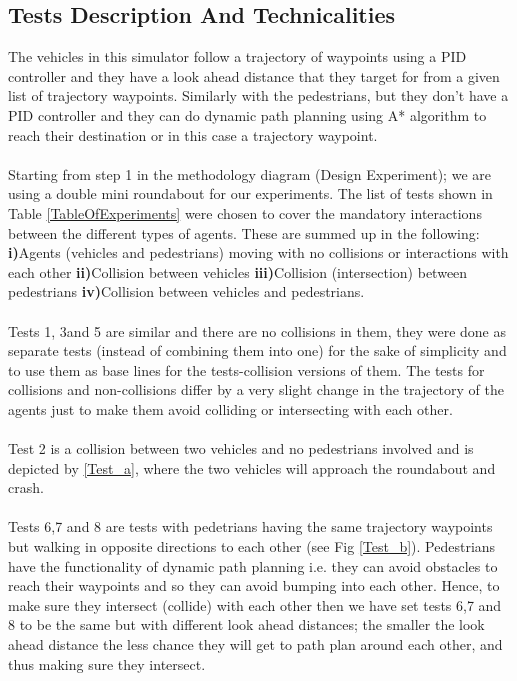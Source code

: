 \subsection{Tests Description And Technicalities}\label{TestsDescriptionAndTechnicalities}
\noindent The vehicles in this simulator follow a trajectory of waypoints using a PID controller and they have a look ahead distance that they target for from a given list of trajectory waypoints. 
Similarly with the pedestrians, but they don't have a PID controller and they can do dynamic path planning using A* algorithm to reach their destination or in this case a trajectory waypoint.\\\\ 
\noindent Starting from step 1 in the methodology diagram (Design Experiment); we are using a double mini roundabout for our experiments. 
The list of tests shown in Table \ref{TableOfExperiments} were chosen to cover the mandatory interactions between the different types of agents. 
These are summed up in the following: \textbf{i)}Agents (vehicles and pedestrians) moving with no collisions or interactions with each other \textbf{ii)}Collision between vehicles \textbf{iii)}Collision (intersection) between pedestrians \textbf{iv)}Collision between vehicles and pedestrians.\\\\
\noindent Tests 1, 3and 5 are similar and there are no collisions in them, they were done as separate tests (instead of combining them into one) for the sake of simplicity and to use them as base lines for the tests-collision versions of them. The tests for collisions and non-collisions differ by a very slight change in the trajectory of the agents just to make them avoid colliding or intersecting with each other. \\\\ 
Test 2 is a collision between two vehicles and no pedestrians involved and is depicted by \ref{Test_a}, where the two vehicles will approach the roundabout and crash.\\\\
Tests 6,7 and 8 are tests with pedetrians having the same trajectory waypoints but walking in opposite directions to each other (see Fig \ref{Test_b}). 
Pedestrians have the functionality of dynamic path planning i.e. they can avoid obstacles to reach their waypoints and so they can avoid bumping into each other. 
Hence, to make sure they intersect (collide) with each other then we  have set tests 6,7 and 8 to be the same but with different look ahead distances; the smaller the look ahead distance the less chance they will get to path plan around each other, and thus making sure they intersect.\\\\ 
